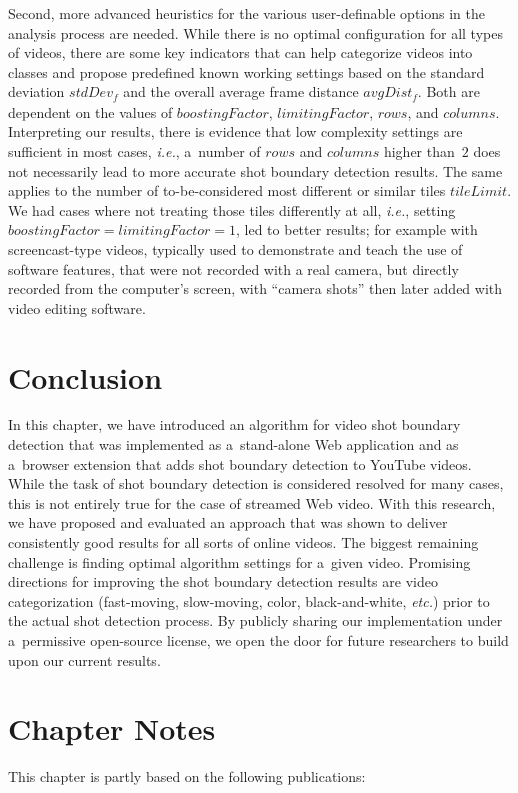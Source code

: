 Second, more advanced heuristics for the various user-definable
options in the analysis process are needed.
While there is no optimal configuration for all types of videos,
there are some key indicators that can help categorize videos
into classes and propose predefined known working settings
based on the standard deviation $\mathit{stdDev_{f}}$
and the overall average frame distance $\mathit{avgDist_{f}}$.
Both are dependent on the values of $\mathit{boostingFactor}$,
$\mathit{limitingFactor}$, $\mathit{rows}$, and $\mathit{columns}$. 
Interpreting our results, there is evidence
that low complexity settings are sufficient in most cases,
\emph{i.e.}, a~number of $\mathit{rows}$ and $\mathit{columns}$
higher than~$\mathit{2}$ does not necessarily
lead to more accurate shot boundary detection results.
The same applies to the number of to-be-considered most different
or similar tiles $\mathit{tileLimit}$.
We had cases where not treating those tiles differently
at all, \emph{i.e.}, setting
$\mathit{boostingFactor} = \mathit{limitingFactor} = \mathit{1}$, 
led to better results; for example with screencast-type videos,
typically used to demonstrate and teach the use of software features,
that were not recorded with a real camera,
but directly recorded from the computer's screen, with ``camera shots''
then later added with video editing software.

\section{Conclusion}

In this chapter, we have introduced an algorithm for video shot boundary detection
that was implemented as a~stand-alone Web application
and as a~browser extension that adds shot boundary detection to YouTube videos.
While the task of shot boundary detection is considered resolved for many cases,
this is not entirely true for the case of streamed Web video.
With this research, we have proposed and evaluated an approach
that was shown to deliver consistently good results for all sorts of online videos.
The biggest remaining challenge is finding optimal algorithm settings
for a~given video.
Promising directions for improving the shot boundary detection results
are video categorization (fast-moving, slow-moving, color, black-and-white, \emph{etc.})
prior to the actual shot detection process.
By publicly sharing our implementation under a~permissive open-source license,
we open the door for future researchers to build upon our current results.

\section*{Chapter Notes}
This chapter is partly based on the following publications:



